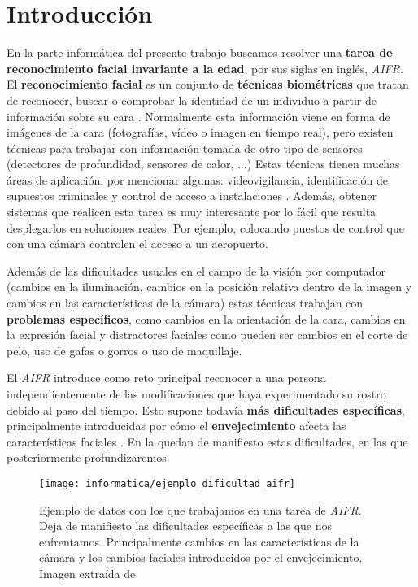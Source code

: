 \chapter{Introducción} \label{ich:introduccion}

En la parte informática del presente trabajo buscamos resolver una \textbf{tarea de reconocimiento facial invariante a la edad}, por sus siglas en inglés, \textit{AIFR}. El \textbf{reconocimiento facial} es un conjunto de \textbf{técnicas biométricas} que tratan de reconocer, buscar o comprobar  la identidad de un individuo a partir de información sobre su cara \cite{informatica:definicion_face_recognition}. Normalmente esta información viene en forma de imágenes de la cara (fotografías, vídeo o imagen en tiempo real), pero existen técnicas para trabajar con información tomada de otro tipo de sensores (detectores de profundidad, sensores de calor, ...) Estas técnicas tienen muchas áreas de aplicación, por mencionar algunas: videovigilancia, identificación de supuestos criminales y control de acceso a instalaciones \cite{informatica:deep_fr_survey}. Además, obtener sistemas que realicen esta tarea es muy interesante por lo fácil que resulta desplegarlos en soluciones reales. Por ejemplo, colocando puestos de control que con una cámara controlen el acceso a un aeropuerto.

Además de las dificultades usuales en el campo de la visión por computador (cambios en la iluminación, cambios en la posición relativa dentro de la imagen y cambios en las características de la cámara) estas técnicas trabajan con \textbf{problemas específicos}, como cambios en la orientación de la cara, cambios en la expresión facial y distractores faciales como pueden ser cambios en el corte de pelo, uso de gafas o gorros o uso de maquillaje.

El \textit{AIFR} introduce como reto principal reconocer a una persona independientemente de las modificaciones que haya experimentado su rostro debido al paso del tiempo. Esto supone todavía \textbf{más dificultades específicas}, principalmente introducidas por cómo el \textbf{envejecimiento} afecta las características faciales \cite{informatica:aifr_survey}. En la  quedan de manifiesto estas dificultades, en las que posteriormente profundizaremos.

\begin{figure}[h]
	\centering
	\texttt{[image: informatica/ejemplo\_dificultad\_aifr]}
	\caption{Ejemplo de datos con los que trabajamos en una tarea de \textit{AIFR}. Deja de manifiesto las dificultades específicas a las que nos enfrentamos. Principalmente cambios en las características de la cámara y los cambios faciales introducidos por el envejecimiento. Imagen extraída de \cite{informatica:aifr_survey}}
	\label{img:ejemplo_dificultad_aifr}
\end{figure}

